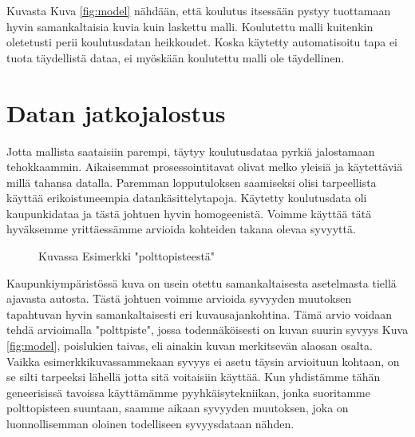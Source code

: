 Kuvasta Kuva \ref{fig:model} nähdään, että koulutus itsessään pystyy tuottamaan hyvin samankaltaisia kuvia kuin laskettu malli. Koulutettu malli kuitenkin oletetusti perii koulutusdatan heikkoudet. Koska käytetty automatisoitu tapa ei tuota täydellistä dataa, ei myöskään koulutettu malli ole täydellinen. 

\section{Datan jatkojalostus}

Jotta mallista saataisiin parempi, täytyy koulutusdataa pyrkiä jalostamaan tehokkaammin. 
Aikaisemmat prosessointitavat olivat melko yleisiä ja käytettäviä millä tahansa datalla.
Paremman lopputuloksen saamiseksi olisi tarpeellista käyttää erikoistuneempia datankäsittelytapoja.
Käytetty koulutusdata oli kaupunkidataa ja tästä johtuen hyvin homogeenistä.
Voimme käyttää tätä hyväksemme yrittäessämme arvioida kohteiden takana olevaa syvyyttä.

\begin{figure}[h]
\centering
{}
\caption{Kuvassa Esimerkki "polttopisteestä"}
\label{fig:polttopiste}
\end{figure}


Kaupunkiympäristössä kuva on usein otettu samankaltaisesta asetelmasta tiellä ajavasta autosta. 
Tästä johtuen voimme arvioida syvyyden muutoksen tapahtuvan hyvin samankaltaisesti eri kuvausajankohtina.
Tämä arvio voidaan tehdä arvioimalla "polttpiste", jossa todennäköisesti on kuvan suurin syvyys Kuva \ref{fig:model},
poislukien taivas, eli ainakin kuvan merkitsevän alaosan osalta.
Vaikka esimerkkikuvassammekaan syvyys ei asetu täysin arvioituun kohtaan,
on se silti tarpeeksi lähellä jotta sitä voitaisiin käyttää. 
Kun yhdistämme tähän geneerisissä tavoissa käyttämämme pyyhkäisytekniikan, jonka suoritamme polttopisteen suuntaan, 
saamme aikaan syvyyden muutoksen, joka on luonnollisemman oloinen todelliseen syvyysdataan nähden.

